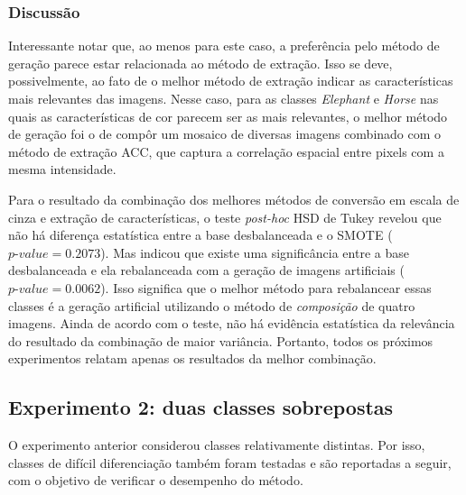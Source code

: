 \subsubsection*{Discussão}


Interessante notar que, ao menos para este caso, a preferência pelo método de geração parece estar relacionada ao método de extração. Isso se deve, possivelmente, ao fato de o melhor método de extração indicar as características mais relevantes das imagens. Nesse caso, para as classes \emph{Elephant} e \emph{Horse} nas quais as características de cor parecem ser as mais relevantes, o melhor método de geração foi o de compôr um mosaico de diversas imagens combinado com o método de extração ACC, que captura a correlação espacial entre pixels com a mesma intensidade.

Para o resultado da combinação dos melhores métodos de conversão em escala de cinza e extração de características, o teste \textit{post-hoc} HSD de Tukey revelou que não há diferença estatística entre a base desbalanceada e o SMOTE ($\textit{p-value} = 0.2073$). Mas indicou que existe uma significância entre a base desbalanceada e ela rebalanceada com a geração de imagens artificiais ($\textit{p-value} = 0.0062$). Isso significa que o melhor método para rebalancear essas classes é a geração artificial utilizando o método de \emph{composição} de quatro imagens. Ainda de acordo com o teste, não há evidência estatística da relevância do resultado da combinação de maior variância. Portanto, todos os próximos experimentos relatam apenas os resultados da melhor combinação.

\subsection{Experimento 2: duas classes sobrepostas}

O experimento anterior considerou classes relativamente distintas. Por isso, classes de difícil diferenciação também foram testadas e são reportadas a seguir, com o objetivo de verificar o desempenho do método.

